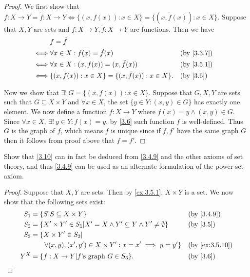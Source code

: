 \begin{proof}
  We first show that \(f : X \to Y = \tilde{f} : X \to Y \iff \{(x, f(x)) : x \in X\} = \{(x, \tilde{f}(x)) : x \in X\}\).
  Suppose that \(X, Y\) are sets and \(f : X \to Y, \tilde{f} : X \to Y\) are functions.
  Then we have
  \begin{align*}
         & f = \tilde{f}                                                                          \\
    \iff & \forall x \in X : f(x) = \tilde{f}(x)                      &  & \by{3.3.7}             \\
    \iff & \forall x \in X : (x, f(x)) = (x, \tilde{f}(x))            &  & \by{3.5.1}             \\
    \iff & \{(x, f(x)) : x \in X\} = \{(x, \tilde{f}(x)) : x \in X\}. &  & \text{(by \cref{3.6})}
  \end{align*}

  Now we show that \(\exists!\ G = \{(x, f(x)) : x \in X\}\).
  Suppose that \(G, X, Y\) are sets such that \(G \subseteq X \times Y\) and \(\forall x \in X\), the set \(\{y \in Y : (x, y) \in G\}\) has exactly one element.
  We now define a function \(f : X \to Y\) where \(f(x) = y \land (x, y) \in G\).
  Since \(\forall x \in X\), \(\exists!\ y \in Y : f(x) = y\), by \cref{3.6} such function \(f\) is well-defined.
  Thus \(G\) is the graph of \(f\), which means \(f\) is unique since if \(f, f'\) have the same graph \(G\) then it follows from proof above that \(f = f'\).
\end{proof}

\begin{ex}\label{ex:3.5.11}
  Show that \cref{3.10} can in fact be deduced from \cref{3.4.9} and the other axioms of set theory, and thus \cref{3.4.9} can be used as an alternate formulation of the power set axiom.
\end{ex}

\begin{proof}
  Suppose that \(X, Y\) are sets.
  Then by \cref{ex:3.5.1}, \(X \times Y\) is a set.
  We now show that the following sets exist:
  \begin{align*}
    S_1 & = \{S | S \subseteq X \times Y\}                                                 &  & \by{3.4.9}                   \\
    S_2 & = \{X' \times Y' \in S_1 | X' = X \land Y' \subseteq Y \land Y' \neq \emptyset\} &  & \text{(by \cref{3.5})}       \\
    S_3 & = \{X \times Y' \in S_2 |                                                                                          \\
        & \quad\quad \forall (x, y), (x', y') \in X \times Y' : x = x' \implies y = y'\}   &  & \text{(by \cref{ex:3.5.10})} \\
    Y^X & = \{f : X \to Y | f \text{'s graph } G \in S_3\}.                                &  & \text{(by \cref{3.6})}
  \end{align*}
\end{proof}

